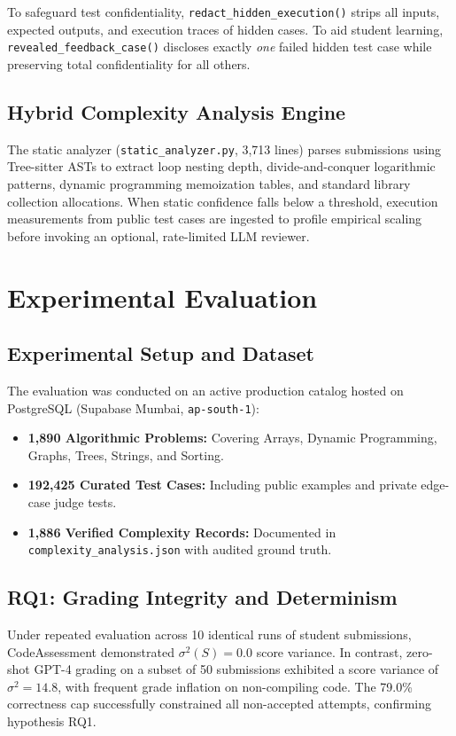 \documentclass[conference]{IEEEtran}
\begin{document}
To safeguard test confidentiality, \texttt{redact\_hidden\_execution()} strips all inputs, expected outputs, and execution traces of hidden cases. To aid student learning, \texttt{revealed\_feedback\_case()} discloses exactly \textit{one} failed hidden test case while preserving total confidentiality for all others.

\subsection{Hybrid Complexity Analysis Engine}
The static analyzer (\texttt{static\_analyzer.py}, 3,713 lines) parses submissions using Tree-sitter ASTs to extract loop nesting depth, divide-and-conquer logarithmic patterns, dynamic programming memoization tables, and standard library collection allocations. When static confidence falls below a threshold, execution measurements from public test cases are ingested to profile empirical scaling before invoking an optional, rate-limited LLM reviewer.

\section{Experimental Evaluation}

\subsection{Experimental Setup and Dataset}
The evaluation was conducted on an active production catalog hosted on PostgreSQL (Supabase Mumbai, \texttt{ap-south-1}):
\begin{itemize}
    \item \textbf{1,890 Algorithmic Problems:} Covering Arrays, Dynamic Programming, Graphs, Trees, Strings, and Sorting.
    \item \textbf{192,425 Curated Test Cases:} Including public examples and private edge-case judge tests.
    \item \textbf{1,886 Verified Complexity Records:} Documented in \texttt{complexity\_analysis.json} with audited ground truth.
\end{itemize}

\subsection{RQ1: Grading Integrity and Determinism}
Under repeated evaluation across 10 identical runs of student submissions, CodeAssessment demonstrated $\sigma^2(S) = 0.0$ score variance. In contrast, zero-shot GPT-4 grading on a subset of 50 submissions exhibited a score variance of $\sigma^2 = 14.8$, with frequent grade inflation on non-compiling code. The 79.0\% correctness cap successfully constrained all non-accepted attempts, confirming hypothesis RQ1.
\end{document}

